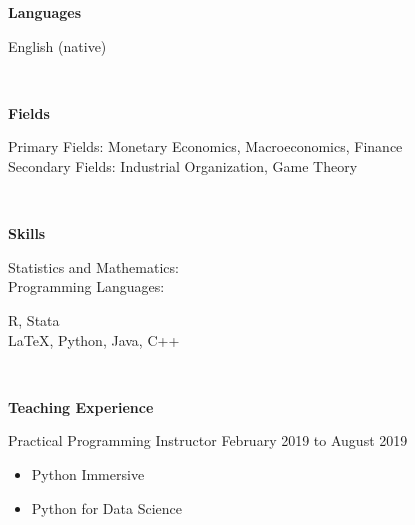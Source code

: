 \documentclass[final]{article}
\begin{document}
	\begin{minipage}[t]{.20\textwidth}
		\Large{\textbf{Languages}} \\
	\end{minipage}
	\begin{minipage}[t]{.80\textwidth}
		English (native)
	\end{minipage}\\

	\begin{minipage}[t]{.20\textwidth}
		\Large{\textbf{Fields}}\\
	\end{minipage}
	\begin{minipage}[t]{.80\textwidth}
		Primary Fields: Monetary Economics, Macroeconomics, Finance\\
		Secondary Fields: Industrial Organization, Game Theory 
	\end{minipage}\\

	\begin{minipage}[t]{.20\textwidth}
		\Large{\textbf{Skills}}\\
	\end{minipage}
	\begin{minipage}[t]{.30\textwidth}
		Statistics and Mathematics:\\
		Programming Languages: 
	\end{minipage}
	\begin{minipage}[t]{.40\textwidth}
		R, Stata\\
		\LaTeX, Python, Java, C++
		
	\end{minipage}
	\\
	
	\begin{minipage}[t]{.20\textwidth}
		\Large{\textbf{Teaching \mbox{Experience}}}\\
	\end{minipage}
	\begin{minipage}[t]{.80\textwidth}
		Practical Programming Instructor \hfill February 2019 to August 2019
		\begin{itemize}
			\item Python Immersive 
			\item Python for Data Science
		\end{itemize}
	\end{minipage}\\
\end{document}
